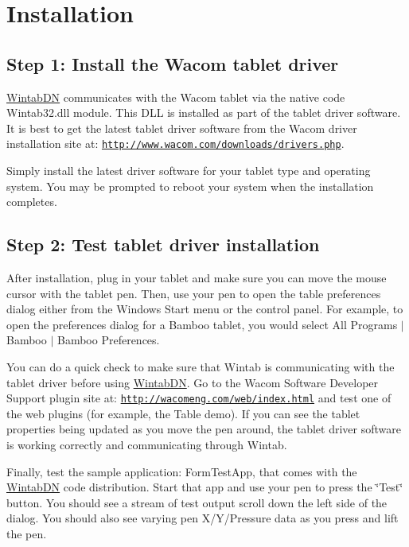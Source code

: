 \hypertarget{page1_install_sec}{}\section{Installation}\label{page1_install_sec}
\hypertarget{page1_step1}{}\subsection{Step 1\+: Install the Wacom tablet driver}\label{page1_step1}
\mbox{\hyperlink{namespace_wintab_d_n}{Wintab\+DN}} communicates with the Wacom tablet via the native code Wintab32.\+dll module. This D\+LL is installed as part of the tablet driver software. It is best to get the latest tablet driver software from the Wacom driver installation site at\+: \href{http://www.wacom.com/downloads/drivers.php}{\tt http\+://www.\+wacom.\+com/downloads/drivers.\+php}.

Simply install the latest driver software for your tablet type and operating system. You may be prompted to reboot your system when the installation completes.\hypertarget{page1_step2}{}\subsection{Step 2\+: Test tablet driver installation}\label{page1_step2}
After installation, plug in your tablet and make sure you can move the mouse cursor with the tablet pen. Then, use your pen to open the table preferences dialog either from the Windows Start menu or the control panel. For example, to open the preferences dialog for a Bamboo tablet, you would select All Programs $\vert$ Bamboo $\vert$ Bamboo Preferences.

You can do a quick check to make sure that Wintab is communicating with the tablet driver before using \mbox{\hyperlink{namespace_wintab_d_n}{Wintab\+DN}}. Go to the Wacom Software Developer Support plugin site at\+: \href{http://wacomeng.com/web/index.html}{\tt http\+://wacomeng.\+com/web/index.\+html} and test one of the web plugins (for example, the Table demo). If you can see the tablet properties being updated as you move the pen around, the tablet driver software is working correctly and communicating through Wintab.

Finally, test the sample application\+: Form\+Test\+App, that comes with the \mbox{\hyperlink{namespace_wintab_d_n}{Wintab\+DN}} code distribution. Start that app and use your pen to press the \char`\"{}\+Test\char`\"{} button. You should see a stream of test output scroll down the left side of the dialog. You should also see varying pen X/\+Y/\+Pressure data as you press and lift the pen.

